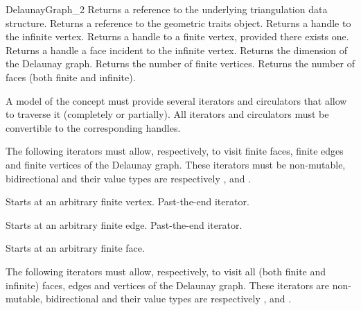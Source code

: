 \begin{ccRefConcept}{DelaunayGraph_2}
{Returns a reference to the underlying triangulation data structure.}
\ccGlue
{}
{Returns a reference to the geometric traits object.}
\ccGlue
{}
{Returns a handle to the infinite vertex.}
\ccGlue
{}
{Returns a handle to a finite vertex, provided there exists one.}
\ccGlue
{}
{Returns a handle a face incident to the infinite vertex.}
\ccGlue
{}
{Returns the dimension of the Delaunay graph.}
\ccGlue
{}
{Returns the number of finite vertices.}
\ccGlue
{}
{Returns the number of faces (both finite and infinite).}



A model of the  concept must provide several
iterators and circulators that allow to traverse it (completely or
partially). All iterators and circulators must be convertible to the
corresponding handles.




The following iterators must allow, respectively, to visit 
finite faces,  finite edges and  finite vertices
of the Delaunay graph. These iterators must be non-mutable,
bidirectional and their value types are respectively
,  and .

{Starts at an arbitrary finite vertex.}
\ccGlue
{}
{Past-the-end iterator.}

{Starts at an arbitrary finite edge.}
\ccGlue
{}
{Past-the-end iterator.}

{Starts at an arbitrary finite face.}
\ccGlue
{}

The following iterators must allow, respectively, to visit all
(both finite and infinite) faces, edges and vertices
of the Delaunay graph. These iterators are non-mutable, bidirectional
and their value types are respectively
,  and . 


\end{ccRefConcept}
